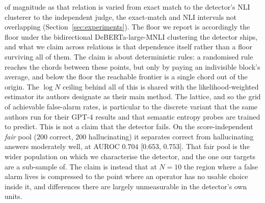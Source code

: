 of magnitude as that relation is varied from exact match to the detector's NLI clusterer to
the independent judge, the exact-match and NLI intervals not overlapping
(Section~\ref{sec:experiments}). The floor we report is accordingly the floor under the
bidirectional DeBERTa-large-MNLI clustering the detector ships, and what we claim across
relations is that dependence itself rather than a floor surviving all of them. The claim is about
deterministic rules: a randomised rule reaches the chords between these points, but only by
paying an indivisible block's average, and below the floor the reachable frontier is a
single chord out of the origin. The $\log N$ ceiling behind all of this is shared with the
likelihood-weighted estimator its authors designate as their main method. The lattice, and
so the grid of achievable false-alarm rates, is particular to the discrete variant that the
same authors run for their GPT-4 results and that semantic entropy probes are trained to
predict. This is not a claim that the detector fails. On the score-independent \emph{fair}
pool ($200$ correct, $200$ hallucinating) it separates correct from hallucinating answers
moderately well, at AUROC $0.704$ [$0.653$, $0.753$]. That fair pool is the wider population
on which we characterise the detector, and the one our targets are a sub-sample of. The
claim is instead that at $N{=}10$ the region where a false alarm lives is compressed to the
point where an operator has no usable choice inside it, and differences there are largely
unmeasurable in the detector's own units.

